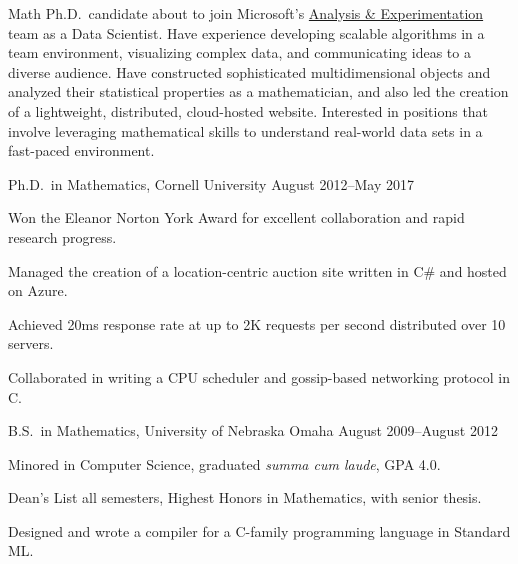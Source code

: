 \documentclass[11pt, letterpaper]{awesome-cv}
\begin{document}
\makecvheader






\begin{cvparagraph}
Math Ph.D.~candidate about to join Microsoft's \href{http://www.exp-platform.com/Pages/default.aspx}{Analysis \& Experimentation} team as a Data Scientist. 
Have experience developing scalable algorithms in a team environment, visualizing complex data, and communicating ideas to a diverse audience.
Have constructed sophisticated multidimensional objects and analyzed their statistical properties as a mathematician, and also led the creation of a lightweight, distributed, cloud-hosted website. 
Interested in positions that involve leveraging mathematical skills to understand real-world data sets in a fast-paced environment. 
\end{cvparagraph}






\begin{cventries}

\cventry
	{Ph.D.~in Mathematics, Cornell University}
	{}{}
	{August 2012--May 2017}
	{
		\begin{cvitems}
			\item{Won the Eleanor Norton York Award for excellent collaboration and rapid research progress.}
			\item{Managed the creation of a location-centric auction site written in C\# and hosted on Azure.}
			\item{Achieved 20ms response rate at up to 2K requests per second distributed over 10 servers.}
			\item{Collaborated in writing a CPU scheduler and gossip-based networking protocol in C.}
		\end{cvitems}
	}
	
\cventry
	{B.S.~in Mathematics, University of Nebraska Omaha}
	{}{}
	{August 2009--August 2012}
	{
		\begin{cvitems}
			\item{Minored in Computer Science, graduated \emph{summa cum laude}, GPA 4.0.}
			\item{Dean's List all semesters, Highest Honors in Mathematics, with senior thesis.}
			\item{Designed and wrote a compiler for a C-family programming language in Standard ML.}
		\end{cvitems}
	}
	
\end{cventries}
\end{document}
